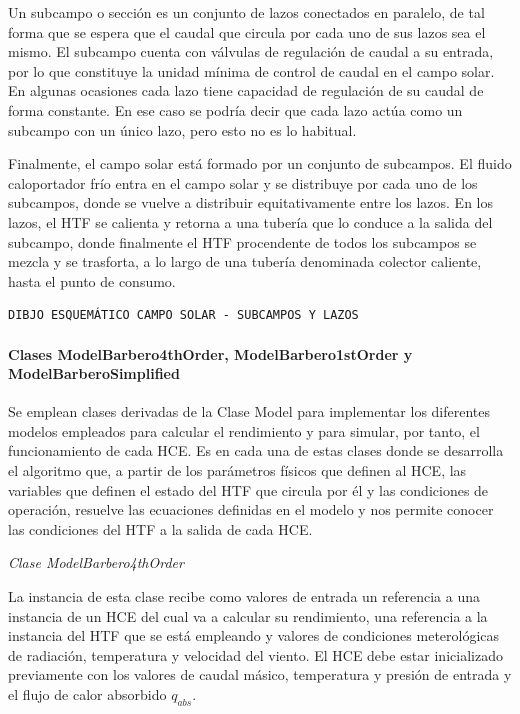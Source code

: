 Un subcampo o sección es un conjunto de lazos conectados en paralelo, de
tal forma que se espera que el caudal que circula por cada uno de sus
lazos sea el mismo. El subcampo cuenta con válvulas de regulación de
caudal a su entrada, por lo que constituye la unidad mínima de control
de caudal en el campo solar. En algunas ocasiones cada lazo tiene
capacidad de regulación de su caudal de forma constante. En ese caso se
podría decir que cada lazo actúa como un subcampo con un único lazo,
pero esto no es lo habitual.

Finalmente, el campo solar está formado por un conjunto de subcampos. El
fluido caloportador frío entra en el campo solar y se distribuye por
cada uno de los subcampos, donde se vuelve a distribuir equitativamente
entre los lazos. En los lazos, el HTF se calienta y retorna a una
tubería que lo conduce a la salida del subcampo, donde finalmente el HTF
procendente de todos los subcampos se mezcla y se trasforta, a lo largo
de una tubería denominada colector caliente, hasta el punto de consumo.

\begin{verbatim}
DIBJO ESQUEMÁTICO CAMPO SOLAR - SUBCAMPOS Y LAZOS
\end{verbatim}

\hypertarget{clases-modelbarbero4thorder-modelbarbero1storder-y-modelbarberosimplified}{%
\paragraph{Clases ModelBarbero4thOrder, ModelBarbero1stOrder y
ModelBarberoSimplified}\label{clases-modelbarbero4thorder-modelbarbero1storder-y-modelbarberosimplified}}

Se emplean clases derivadas de la Clase Model para implementar los
diferentes modelos empleados para calcular el rendimiento y para
simular, por tanto, el funcionamiento de cada HCE. Es en cada una de
estas clases donde se desarrolla el algoritmo que, a partir de los
parámetros físicos que definen al HCE, las variables que definen el
estado del HTF que circula por él y las condiciones de operación,
resuelve las ecuaciones definidas en el modelo y nos permite conocer las
condiciones del HTF a la salida de cada HCE.

\emph{Clase ModelBarbero4thOrder}

La instancia de esta clase recibe como valores de entrada un referencia
a una instancia de un HCE del cual va a calcular su rendimiento, una
referencia a la instancia del HTF que se está empleando y valores de
condiciones meterológicas de radiación, temperatura y velocidad del
viento. El HCE debe estar inicializado previamente con los valores de
caudal másico, temperatura y presión de entrada y el flujo de calor
absorbido \(q_{abs}\).


